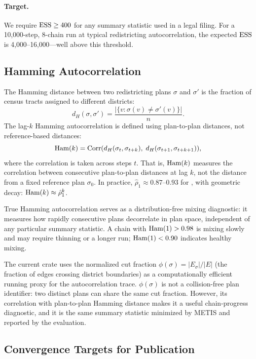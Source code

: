 \paragraph{Target.}
We require $\mathrm{ESS} \geq 400$ for any summary statistic used in a legal
filing.
For a 10{,}000-step, 8-chain run at typical redistricting autocorrelation,
the expected $\mathrm{ESS}$ is 4{,}000--16{,}000---well above this threshold.

\subsection{Hamming Autocorrelation}

The Hamming distance between two redistricting plans $\sigma$ and $\sigma'$
is the fraction of census tracts assigned to different districts:
\[
  d_H(\sigma, \sigma') = \frac{|\{v : \sigma(v) \neq \sigma'(v)\}|}{n}.
\]
The lag-$k$ Hamming autocorrelation is defined using plan-to-plan
distances, not reference-based distances:
\[
  \mathrm{Ham}(k) = \mathrm{Corr}(d_H(\sigma_t, \sigma_{t+k}),\; d_H(\sigma_{t+1}, \sigma_{t+k+1})),
\]
where the correlation is taken across steps $t$.
That is, $\mathrm{Ham}(k)$ measures the correlation between consecutive
plan-to-plan distances at lag $k$, not the distance from a fixed
reference plan $\sigma_0$.
In practice, $\hat{\rho}_1 \approx 0.87$--$0.93$ for \recom{}, with
geometric decay: $\mathrm{Ham}(k) \approx \hat{\rho}_1^k$.

True Hamming autocorrelation serves as a distribution-free mixing diagnostic:
it measures how rapidly consecutive plans decorrelate in plan space,
independent of any particular summary statistic.
A chain with $\mathrm{Ham}(1) > 0.98$ is mixing slowly and may require
thinning or a longer run; $\mathrm{Ham}(1) < 0.90$ indicates healthy mixing.

The current crate uses the normalized cut fraction
$\phi(\sigma) = |E_\sigma| / |E|$ (the fraction of edges crossing district
boundaries) as a computationally efficient running proxy for the
autocorrelation trace.
$\phi(\sigma)$ is not a collision-free plan identifier: two distinct
plans can share the same cut fraction.
However, its correlation with plan-to-plan Hamming distance makes it a useful
chain-progress diagnostic, and it is the same summary statistic minimized by
METIS and reported by the \ar{} evaluation.

\subsection{Convergence Targets for Publication}

